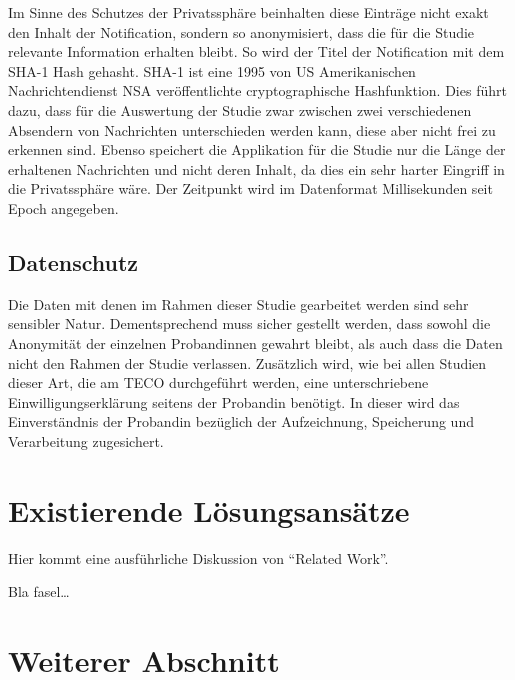 Im Sinne des Schutzes der Privatssphäre beinhalten diese Einträge nicht exakt den Inhalt der Notification, sondern so anonymisiert, dass die für die Studie relevante Information erhalten bleibt.
So wird der Titel der Notification mit dem SHA-1 Hash\cite{sha1def} gehasht.
SHA-1 ist eine 1995 von US Amerikanischen Nachrichtendienst NSA veröffentlichte cryptographische Hashfunktion\cite{sha1proposal}.
Dies führt dazu, dass für die Auswertung der Studie zwar zwischen zwei verschiedenen Absendern von Nachrichten unterschieden werden kann, diese aber nicht frei zu erkennen sind.
Ebenso speichert die Applikation für die Studie nur die Länge der erhaltenen Nachrichten und nicht deren Inhalt, da dies ein sehr harter Eingriff in die Privatssphäre wäre.
Der Zeitpunkt wird im Datenformat Millisekunden seit Epoch angegeben.



\subsection{Datenschutz}

Die Daten mit denen im Rahmen dieser Studie gearbeitet werden sind sehr sensibler Natur.
Dementsprechend muss sicher gestellt werden, dass sowohl die Anonymität der einzelnen Probandinnen gewahrt bleibt,
als auch dass die Daten nicht den Rahmen der Studie verlassen.
Zusätzlich wird, wie bei allen Studien dieser Art, die am TECO durchgeführt werden,
eine unterschriebene Einwilligungserklärung seitens der Probandin benötigt.
In dieser wird das Einverständnis der Probandin bezüglich der Aufzeichnung, Speicherung und Verarbeitung zugesichert.
\par



\section{Existierende Lösungsansätze}
\label{ch:Analyse:sec:RelatedWork}

Hier kommt eine ausführliche Diskussion
von "`Related Work"'.

Bla fasel\ldots

\section{Weiterer Abschnitt}
\label{ch:Analyse:sec:Abschnitt}


